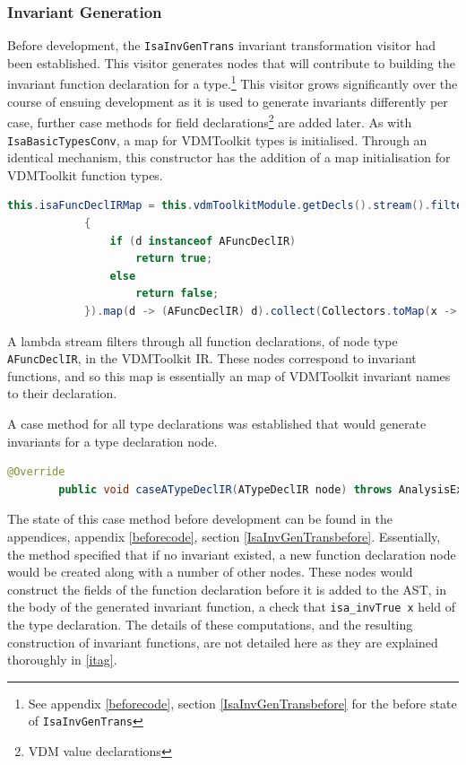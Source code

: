 	\subsubsection{Invariant Generation} \label{iigt}
	Before development, the \lstinline[language=Java]{IsaInvGenTrans} invariant transformation visitor had been established. This visitor generates nodes that will contribute to building the invariant function declaration for a type.\footnote{See appendix \ref{beforecode}, section \ref{IsaInvGenTransbefore} for the before state of \lstinline[language=Java]{IsaInvGenTrans}} 
	This visitor grows significantly over the course of ensuing development as it is used to generate invariants differently per case, further case methods for field declarations\footnote{VDM value declarations} are added later. As with \lstinline[language=Java]{IsaBasicTypesConv}, a map for VDMToolkit types is initialised. Through an identical mechanism, this constructor has the addition of a map initialisation for VDMToolkit function types.
	\begin{lstlisting}[language=Java]
	this.isaFuncDeclIRMap = this.vdmToolkitModule.getDecls().stream().filter(d ->
	        {
	            if (d instanceof AFuncDeclIR)
	                return true;
	            else
	                return false;
	        }).map(d -> (AFuncDeclIR) d).collect(Collectors.toMap(x -> x.getName(), x -> x));
	\end{lstlisting}
	A lambda stream filters through all function declarations, of node type \lstinline[language=Java]{AFuncDeclIR}, in the VDMToolkit IR. These nodes correspond to invariant functions, and so this map is essentially an map of VDMToolkit invariant names to their declaration. 

	A case method for all type declarations was established that would generate invariants for a type declaration node.
	\begin{lstlisting}[language=Java]
	@Override
	    public void caseATypeDeclIR(ATypeDeclIR node) throws AnalysisException {
	\end{lstlisting}
	
	The state of this case method before development can be found in the appendices, appendix \ref{beforecode}, section \ref{IsaInvGenTransbefore}. Essentially, the method specified that if no invariant existed, a new function declaration node would be created along with a number of other nodes. These nodes would construct the fields of the function declaration before it is added to the AST, in the body of the generated invariant function, a check that \lstinline[language=Java]{isa_invTrue x} held of the type declaration. The details of these computations, and the resulting construction of invariant functions, are not detailed here as they are explained thoroughly in \ref{itag}.

